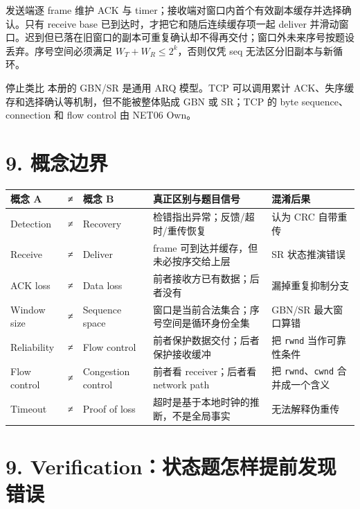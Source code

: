 \documentclass[UTF8,fontset=none,11pt,a4paper]{ctexart}
\providecommand{\passthrough}[1]{#1}
\begin{document}
发送端逐 frame 维护 ACK 与 timer；接收端对窗口内首个有效副本缓存并选择确认。只有 receive base 已到达时，才把它和随后连续缓存项一起 deliver 并滑动窗口。迟到但已落在旧窗口的副本可重复确认却不得再交付；窗口外未来序号按题设丢弃。序号空间必须满足 $W_T+W_R\le 2^k$，否则仅凭 seq 无法区分旧副本与新循环。

\begin{warnbox}{停止类比}
本册的 GBN/SR 是通用 ARQ 模型。TCP 可以调用累计 ACK、失序缓存和选择确认等机制，但不能被整体贴成 GBN 或 SR；TCP 的 byte sequence、connection 和 flow control 由 NET06 Own。
\end{warnbox}

\section{9. 概念边界}\label{8-ux6982ux5ff5ux8fb9ux754c}

\begin{longtable}[]{@{}lclll@{}}
\toprule\noalign{}
概念 A & ≠ & 概念 B & 真正区别与题目信号 & 混淆后果 \\
\midrule\noalign{}
\endhead
\bottomrule\noalign{}
\endlastfoot
Detection & ≠ & Recovery & 检错指出异常；反馈/超时/重传恢复 & 认为 CRC
自带重传 \\
Receive & ≠ & Deliver & frame 可到达并缓存，但未必按序交给上层 & SR
状态推演错误 \\
ACK loss & ≠ & Data loss & 前者接收方已有数据；后者没有 &
漏掉重复抑制分支 \\
Window size & ≠ & Sequence space &
窗口是当前合法集合；序号空间是循环身份全集 & GBN/SR 最大窗口算错 \\
Reliability & ≠ & Flow control & 前者保护数据交付；后者保护接收缓冲 & 把
\passthrough{\lstinline!rwnd!} 当作可靠性条件 \\
Flow control & ≠ & Congestion control & 前者看 receiver；后者看 network
path & 把 \passthrough{\lstinline!rwnd!}、\passthrough{\lstinline!cwnd!}
合并成一个含义 \\
Timeout & ≠ & Proof of loss & 超时是基于本地时钟的推断，不是全局事实 &
无法解释伪重传 \\
\end{longtable}

\section{9.
Verification：状态题怎样提前发现错误}\label{9-verificationux72b6ux6001ux9898ux600eux6837ux63d0ux524dux53d1ux73b0ux9519ux8bef}
\end{document}
